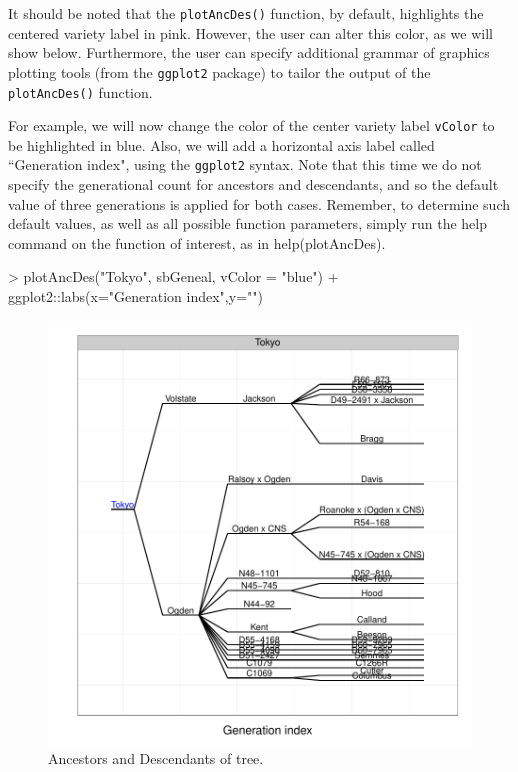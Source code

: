 \documentclass{article}
\numberwithin{equation}{section} %
\begin{document}
It should be noted that the \texttt{plotAncDes()} function, by default, highlights the centered variety label in pink. However, the user can alter this color, as we will show below. Furthermore, the user can specify additional grammar of graphics plotting tools (from the \texttt{ggplot2} package) to tailor the output of the \texttt{plotAncDes()} function.

For example, we will now change the color of the center variety label \texttt{vColor} to be highlighted in blue. Also, we will add a horizontal axis label called ``Generation index", using the \texttt{ggplot2} syntax. Note that this time we do not specify the generational count for ancestors and descendants, and so the default value of three generations is applied for both cases. Remember, to determine such default values, as well as all possible function parameters, simply run the help command on the function of interest, as in help(plotAncDes).

\begin{Schunk}
\begin{Sinput}
> plotAncDes("Tokyo", sbGeneal, vColor = "blue") + ggplot2::labs(x="Generation index",y="")
\end{Sinput}
\end{Schunk}

\begin{figure} 
  \begin{center} 
\includegraphics{ggenealogy-plotAncDes2}
\end{center} 
\caption{Ancestors and Descendants of tree.}
\label{fig:plotAncDes2}
\end{figure}
\end{document}
